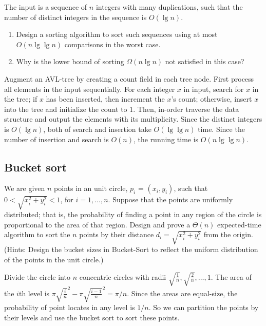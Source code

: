 \begin{Exercise}[origin={NCU CSIE 98}]
The input is a sequence of $n$ integers with many duplications, such that the number of distinct integers in the sequence is $O(\lg n)$.
\begin{enumerate}
\item Design a sorting algorithm to sort such sequences using at most $O(n \lg \lg n)$ comparisons in the worst case.
\item Why is the lower bound of sorting $\Omega(n \lg n)$ not satisfied in this case?
\end{enumerate}
\end{Exercise}
\begin{Answer}
Augment an AVL-tree by creating a count field in each tree node. First process all elements in the input sequentially. For each integer $x$ in input, search for $x$ in the tree; if $x$ has been inserted, then increment the $x$'s count; otherwise, insert $x$ into the tree and initialize the count to $1$. Then, in-order traverse the data structure and output the elements with its multiplicity. Since the distinct integers is $O(\lg n)$, both of search and insertion take $O(\lg \lg n)$ time. Since the number of insertion and search is $O(n)$, the running time is $O(n \lg \lg n)$.
\end{Answer}

\subsection{Bucket sort}
\begin{Exercise}[origin={NDHU CSIE 97}]
We are given $n$ points in an unit circle, $ p_i$ = $(x_i, y_i)$, such that $0 < \sqrt{x_i^2 + y_i^2} < 1$, for $i = 1, \dots, n$. Suppose that the points are uniformly distributed; that is, the probability of finding a point in any region of the circle is proportional to the area of that region. Design and prove a $\Theta(n)$ expected-time algorithm to sort the $n$ points by their distance $d_i = \sqrt{x_i^2 + y_i^2}$ from the origin. (Hints: Design the bucket sizes in Bucket-Sort to reflect the uniform distribution of the points in the unit circle.)
\end{Exercise}
\begin{Answer}
Divide the circle into $n$ concentric circles with radii $\sqrt{\frac{1}{n}}, \sqrt{\frac{2}{n}}, \dots, 1$. The area of the $i$th level is $\pi {\sqrt{\frac{i}{n}}}^2 - \pi {\sqrt{\frac{i-1}{n}}}^2 = \pi/n$. Since the areas are equal-size, the probability of point locates in any level is $1/n$. So we can partition the points by their levels and use the bucket sort to sort these points.
\end{Answer}

